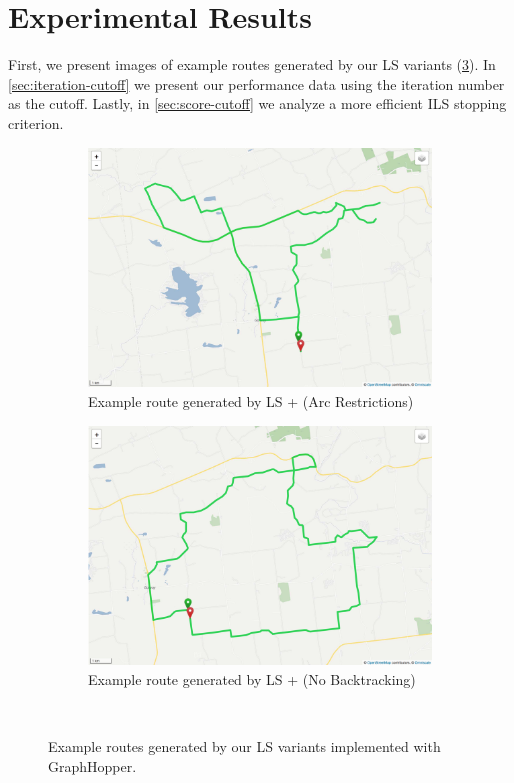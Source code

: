 \documentclass[honors]{union-cs-thesis}
\begin{document}
\section{Experimental Results}
First, we present images of example routes generated by our LS variants (\cref{fig:ls-route-variants}). In \cref{sec:iteration-cutoff} we present our performance data using the iteration number as the cutoff. Lastly, in \cref{sec:score-cutoff} we analyze a more efficient ILS stopping criterion.  

\begin{figure}
\begin{subfigure}{.48\linewidth}
\centering
\includegraphics[width=\textwidth]{figs/ls-route-mins}
\caption{Example route generated by LS + (Arc Restrictions)}
\label{fig:ls-arc-restrictions}
\end{subfigure}%
\hfill
\begin{subfigure}{.48\linewidth}
\centering
\includegraphics[width=\textwidth]{figs/ls-route-no-backtracking}
\caption{Example route generated by LS + (No Backtracking)}
\label{fig:ls-no-backtracking}
\end{subfigure}\\[1ex]
\caption[LS variant example routes]{Example routes generated by our LS variants implemented with GraphHopper.}
\label{fig:ls-route-variants}
\end{figure}
\end{document}
